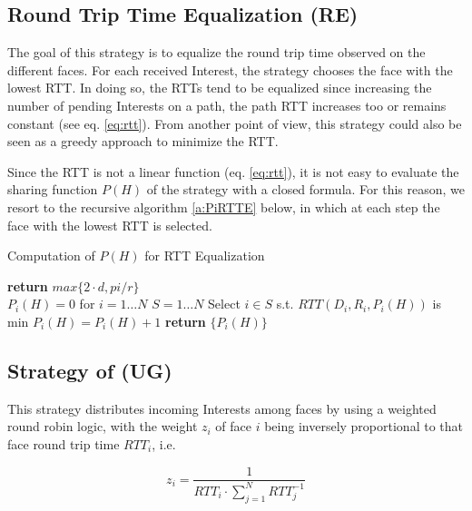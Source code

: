 \documentclass{sig-alternate-10pt}
\begin{document}
\subsection{Round Trip Time Equalization (RE)}
The goal of this strategy is to equalize the round trip time observed on the different faces. For each received Interest, the strategy chooses the face with the lowest RTT. In doing so, the RTTs tend to be equalized since increasing the number of pending Interests on a path, the path RTT increases too or remains constant (see eq. \ref{eq:rtt}). From another point of view, this strategy could also be seen as a greedy approach to minimize the RTT. 

Since the RTT is not a linear function (eq. \ref{eq:rtt}), it is not easy to evaluate the sharing function $P(H)$ of the strategy with a closed formula. For this reason, we resort to the recursive algorithm \ref{a:PiRTTE} below, in which at each step the face with the lowest RTT is selected.



\begin{algorithm}
\caption{Computation of $P(H)$ for RTT Equalization}
\label{a:PiRTTE}
\begin{algorithmic}[1]
\State \textbf{return} $max\{2 \cdot d, pi/r\}$
\EndProcedure
\\
\State $P_i(H) = 0$ for $i = 1 \dots N$
\State $S = 1 \dots N$
\State Select $i \in S$ s.t. $RTT(D_i,R_i,P_i(H))$ is min
\State $P_i(H) = P_i(H) + 1$
\EndFor
\State \textbf{return} $\{P_i(H)\}$
\EndProcedure
\end{algorithmic}
\end{algorithm}


\subsection{Strategy of \cite{udugama} (UG)}
\label{s:ug}
This strategy distributes incoming Interests among faces by using a weighted round robin logic, with the weight $z_i$ of face $i$ being inversely proportional to that face round trip time $RTT_i$, i.e.

\begin{equation}
\label{eq:ziUG}
z_i = \frac{1}{RTT_i \cdot \sum_{j=1}^{N} RTT_j^{-1}}
\end{equation}
\end{document}

